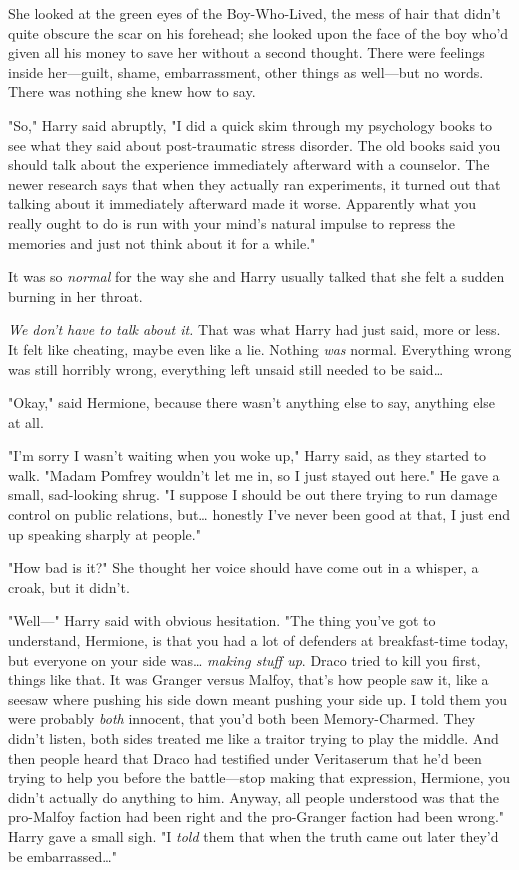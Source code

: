 She looked at the green eyes of the Boy-Who-Lived, the mess of hair that didn't
quite obscure the scar on his forehead; she looked upon the face of the boy
who'd given all his money to save her without a second thought. There were
feelings inside her---guilt, shame, embarrassment, other things as well---but
no words. There was nothing she knew how to say.

"So," Harry said abruptly, "I did a quick skim through my psychology books to
see what they said about post-traumatic stress disorder. The old books said you
should talk about the experience immediately afterward with a counselor. The
newer research says that when they actually ran experiments, it turned out that
talking about it immediately afterward made it worse. Apparently what you
really ought to do is run with your mind's natural impulse to repress the
memories and just not think about it for a while."

It was so \emph{normal} for the way she and Harry usually talked that she felt
a sudden burning in her throat.

\emph{We don't have to talk about it.} That was what Harry had just said, more
or less. It felt like cheating, maybe even like a lie. Nothing \emph{was}
normal. Everything wrong was still horribly wrong, everything left unsaid still
needed to be said{\ldots}

"Okay," said Hermione, because there wasn't anything else to say, anything else
at all.

"I'm sorry I wasn't waiting when you woke up," Harry said, as they started to
walk. "Madam Pomfrey wouldn't let me in, so I just stayed out here." He gave a
small, sad-looking shrug. "I suppose I should be out there trying to run damage
control on public relations, but{\ldots} honestly I've never been good at that,
I just end up speaking sharply at people."

"How bad is it?" She thought her voice should have come out in a whisper, a
croak, but it didn't.

"Well---" Harry said with obvious hesitation. "The thing you've got to
understand, Hermione, is that you had a lot of defenders at breakfast-time
today, but everyone on your side was{\ldots} \emph{making stuff up}. Draco
tried to kill you first, things like that. It was Granger versus Malfoy, that's
how people saw it, like a seesaw where pushing his side down meant pushing your
side up. I told them you were probably \emph{both} innocent, that you'd both
been Memory-Charmed. They didn't listen, both sides treated me like a traitor
trying to play the middle. And then people heard that Draco had testified under
Veritaserum that he'd been trying to help you before the battle---stop making
that expression, Hermione, you didn't actually do anything to him. Anyway, all
people understood was that the pro-Malfoy faction had been right and the
pro-Granger faction had been wrong." Harry gave a small sigh. "I \emph{told}
them that when the truth came out later they'd be embarrassed{\ldots}"

